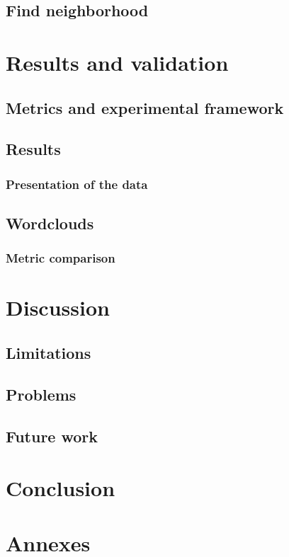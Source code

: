 \documentclass[a4paper]{article}
\begin{document}
	\subsection{Find neighborhood}
	
	
	
	
	
	
	
	
	\section{Results and validation}
	
	\subsection{Metrics and experimental framework}
	
	\subsection{Results}
	
	\subsubsection{Presentation of the data}
	
	\subsection{Wordclouds}
	
	\subsubsection{Metric comparison}
	
	
	\section{Discussion}
	
	\subsection{Limitations}
	
	\subsection{Problems}
	
	\subsection{Future work}

	\section{Conclusion}	
	
	
	
	
	\section{Annexes}
	
	
	
\end{document}
